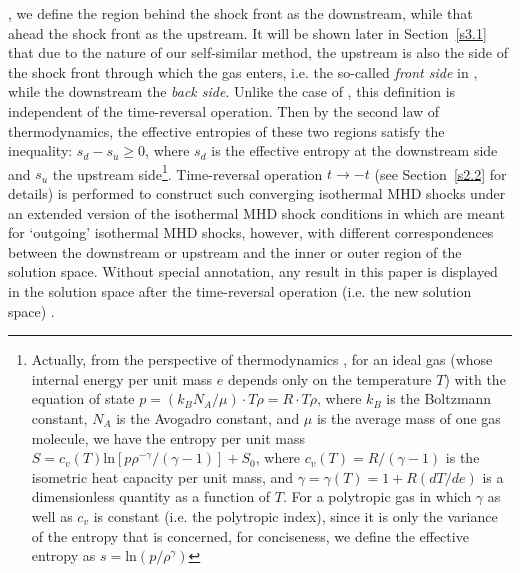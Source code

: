 \documentclass[fleqn,usenatbib]{mnras}
\begin{document}
, we define the region behind the shock front as the downstream, while that ahead the shock front as the upstream. It will be shown later in Section~\ref{s3.1} that due to the nature of our self-similar method, the upstream is also the side of the shock front through which the gas enters, i.e. the so-called \textit{front side} in \citet{SFSW}, while the downstream the \textit{back side}. Unlike the case of \citet{lou2014self}, this definition is independent of the time-reversal operation. Then by the second law of thermodynamics, the effective entropies of these two regions satisfy the inequality: $s_{d}-s_{u}\geq 0$, where $s_{d}$ is the effective entropy at the downstream side and $s_{u}$ the upstream side\footnote{Actually, from the perspective of thermodynamics \citep{SFSW}, for an ideal gas (whose internal energy per unit mass $e$ depends only on the temperature $T$) with the equation of state $p=\left(k_{B}N_{A}/\mu\right)\cdot T\rho=R\cdot T\rho$, where $k_{B}$ is the Boltzmann constant, $N_{A}$ is the Avogadro constant, and $\mu$ is the average mass of one gas molecule, we have the entropy per unit mass $S=c_{v}(T)\mathrm{ln}\left[ p\rho^{-\gamma}/\left(\gamma-1\right)\right]+S_{0}$, where $c_{v}(T)=R/\left(\gamma-1\right)$ is the isometric heat capacity per unit mass, and $\gamma=\gamma(T)=1+R\left(dT/de\right)$ is a dimensionless quantity as a function of $T$. For a polytropic gas in which $\gamma$ as well as $c_{v}$ is constant (i.e. the polytropic index), since it is only the variance of the entropy that is concerned, for conciseness, we define the effective entropy as $s=\mathrm{ln}\left(p/\rho^{\gamma}\right)$}. Time-reversal operation $t\rightarrow -t$ (see Section~\ref{s2.2} for details) is performed to construct such converging isothermal MHD shocks under an extended version of the isothermal MHD shock conditions in \citet{yuLou2006} which are meant for `outgoing' isothermal MHD shocks, however, with different correspondences between the downstream or upstream and the inner or outer region of the solution space. Without special annotation, any result in this paper is displayed in the solution space after the time-reversal operation (i.e. the new solution space)
.
\end{document}
